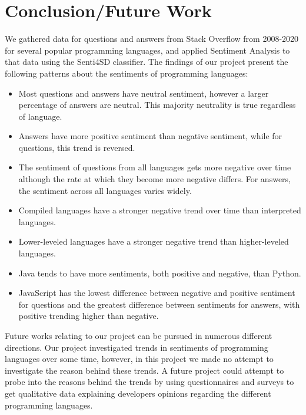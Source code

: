 \documentclass[conference]{IEEEtran}
\begin{document}
\section{Conclusion/Future Work}
We gathered data for questions and answers from Stack Overflow from 2008-2020 for several popular programming languages, and applied Sentiment Analysis to that data using the Senti4SD classifier. The findings of our project present the following patterns about the sentiments of programming languages:\\

\begin{itemize}
    \item Most questions and answers have neutral sentiment, however a larger percentage of answers are neutral. This majority neutrality is true regardless of language.
    \item Answers have more positive sentiment than negative sentiment, while for questions, this trend is reversed. 
    \item The sentiment of questions from all languages gets more negative over time although the rate at which they become more negative differs. For answers, the sentiment across all languages varies widely.
    \item Compiled languages have a stronger negative trend over time than interpreted languages.
    \item Lower-leveled languages have a stronger negative trend than higher-leveled languages. 
    \item Java tends to have more sentiments, both positive and negative, than Python.
    \item JavaScript has the lowest difference between negative and positive sentiment for questions and the greatest difference between sentiments for answers, with positive trending higher than negative.\\
\end{itemize}

Future works relating to our project can be pursued in numerous different directions. Our project investigated trends in sentiments of programming languages over some time, however, in this project we made no attempt to investigate the reason behind these trends. A future project could attempt to probe into the reasons behind the trends by using questionnaires and surveys to get qualitative data explaining developers opinions regarding the different programming languages.\\
\end{document}
